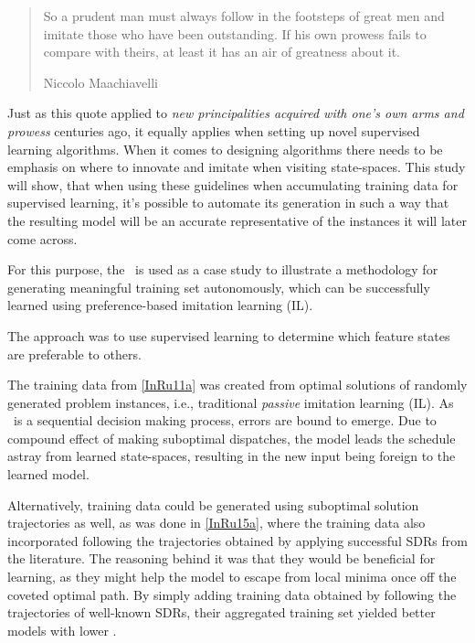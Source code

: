 \begin{quote}
    So a prudent man must always follow in the footsteps of great men and 
    imitate those who have been outstanding. If his own prowess fails to 
    compare with theirs, at least it has an air of greatness about it. 
    
    \raggedleft Niccolo Maachiavelli \cite{Maachiavelli}
\end{quote}
Just as this quote applied to \emph{new principalities acquired with one's own 
    arms and prowess} centuries ago, it equally applies when setting up novel 
supervised learning algorithms. 
When it comes to designing algorithms there needs to be emphasis on where to 
innovate and imitate when visiting state-spaces. 
This study will show, that when using these guidelines when accumulating 
training data for supervised  learning, it's possible to automate its 
generation in such a way that the resulting model will be an accurate 
representative of the instances it will later come across. 

For this purpose, the \JSP\ is used as a case study 
to illustrate a methodology for generating meaningful training set 
autonomously, which can be successfully learned using preference-based 
imitation learning (IL).

The approach was to use supervised learning to determine which feature states 
are preferable to others. 

The training data from \cref{InRu11a} was created from optimal solutions of 
randomly generated problem instances, i.e., traditional \emph{passive} 
imitation learning (IL). 
As \JSP\ is a sequential decision making process, errors are bound to emerge.  
Due to compound effect of making suboptimal dispatches, the model leads the 
schedule astray from learned state-spaces, resulting in the new input being 
foreign to the learned model. 

Alternatively, training data could be generated using suboptimal solution 
trajectories as well, as was done in \cref{InRu15a}, where the training data 
also incorporated following the trajectories obtained by applying successful 
SDRs from the literature. 
The reasoning behind it was that  they would be beneficial for learning, 
as they might help the model to escape from local minima once off the coveted 
optimal path. 
By simply adding training data obtained by following the trajectories of 
well-known SDRs, their aggregated training set yielded better models with lower 
\namerho.


